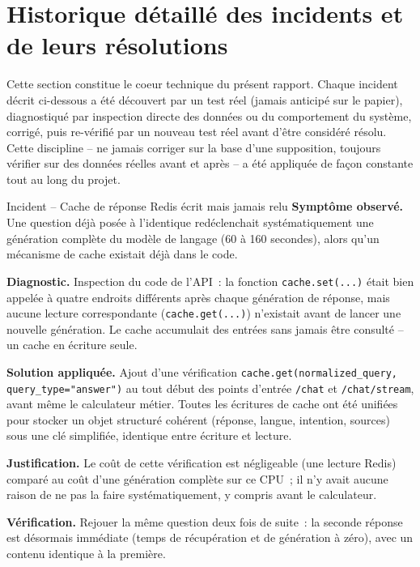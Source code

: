 \section{Historique détaillé des incidents et de leurs résolutions}
\label{sec:incidents}

Cette section constitue le coeur technique du présent rapport. Chaque incident décrit ci-dessous a été découvert par un test réel (jamais anticipé sur le papier), diagnostiqué par inspection directe des données ou du comportement du système, corrigé, puis re-vérifié par un nouveau test réel avant d'être considéré résolu. Cette discipline -- ne jamais corriger sur la base d'une supposition, toujours vérifier sur des données réelles avant et après -- a été appliquée de façon constante tout au long du projet.

\begin{probbox}{Incident -- Cache de réponse Redis écrit mais jamais relu}
\textbf{Symptôme observé.} Une question déjà posée à l'identique redéclenchait systématiquement une génération complète du modèle de langage (60 à 160 secondes), alors qu'un mécanisme de cache existait déjà dans le code.

\textbf{Diagnostic.} Inspection du code de l'API~: la fonction \texttt{cache.set(...)} était bien appelée à quatre endroits différents après chaque génération de réponse, mais aucune lecture correspondante (\texttt{cache.get(...)}) n'existait avant de lancer une nouvelle génération. Le cache accumulait des entrées sans jamais être consulté -- un cache en écriture seule.

\textbf{Solution appliquée.} Ajout d'une vérification \texttt{cache.get(normalized\_query, query\_type="answer")} au tout début des points d'entrée \texttt{/chat} et \texttt{/chat/stream}, avant même le calculateur métier. Toutes les écritures de cache ont été unifiées pour stocker un objet structuré cohérent (réponse, langue, intention, sources) sous une clé simplifiée, identique entre écriture et lecture.

\textbf{Justification.} Le coût de cette vérification est négligeable (une lecture Redis) comparé au coût d'une génération complète sur ce CPU~; il n'y avait aucune raison de ne pas la faire systématiquement, y compris avant le calculateur.

\textbf{Vérification.} Rejouer la même question deux fois de suite~: la seconde réponse est désormais immédiate (temps de récupération et de génération à zéro), avec un contenu identique à la première.
\end{probbox}

